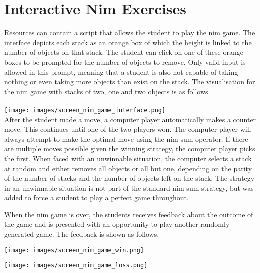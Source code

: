 \section{Interactive Nim Exercises}
\label{sec:apx_nimjs}
Resources can contain a script that allows the student to play the nim
game. The interface depicts each stack as an orange box of which the height is linked to the number of objects on that stack. The student can click on one of these
orange boxes to be prompted for the number of objects to remove. Only valid
input is allowed in this prompt, meaning that a student is also not capable of
taking nothing or even taking more objects than exist on the stack. The
visualisation for the nim game with stacks of two, one and two objects is as
follows.\\\\
\texttt{[image: images/screen\_nim\_game\_interface.png]}\\
After the student made a move, a computer player automatically makes a counter move.
This continues until one of the two players won. The computer player will
always attempt to make the optimal move using the nim-sum operator. If there
are multiple moves possible given the winning strategy, the computer player
picks the first. When faced with an unwinnable situation, the computer selects
a stack at random and either removes all objects or all but one, depending on
the parity of the number of stacks and the number of objects left on the stack.
The strategy in an unwinnable situation is not part of the standard nim-sum
strategy, but was added to force a student to play a perfect game throughout.

When the nim game is over, the students receives feedback about the outcome of
the game and is presented with an opportunity to play another randomly
generated game. The feedback is shown as follows.
\begin{minipage}{0.5\linewidth}
\texttt{[image: images/screen\_nim\_game\_win.png]}
\end{minipage}
\begin{minipage}{0.5\linewidth}
\texttt{[image: images/screen\_nim\_game\_loss.png]}
\end{minipage}

